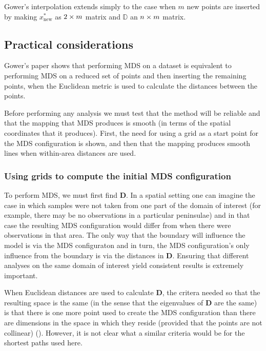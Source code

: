 Gower's interpolation extends simply to the case when $m$ new points are inserted by making $x^*_{\text{new}}$ as $2 \times m$ matrix and $\mathbb{D}$ an $n \times m$ matrix.


\subsection{Practical considerations}

Gower's paper shows that performing MDS on a dataset is equivalent to performing MDS on a reduced set of points and then inserting the remaining points, when the Euclidean metric is used to calculate the distances between the points. 

Before performing any analysis we must test that the method will be reliable and that the mapping that MDS produces  is smooth (in terms of the spatial coordinates that it produces). First, the need for using a grid as a start point for the MDS configuration is shown, and then that the mapping produces smooth lines when within-area distances are used.

\subsubsection{Using grids to compute the initial MDS configuration}
\label{grids}

To perform MDS, we must first find $\mathbf{D}$. In a spatial setting one can imagine the case in which samples were not taken from one part of the domain of interest (for example, there may be no observations in a particular peninsulae) and in that case the resulting MDS configuration would differ from when there were observations in that area. The only way that the boundary will influence the model is via the MDS configuraton and in turn, the MDS configuration's only influence from the boundary is via the distances in $\mathbf{D}$. Ensuring that different analyses on the same domain of interest yield consistent results is extremely important. 

When Euclidean distances are used to calculate $\mathbf{D}$, the critera needed so that the resulting space is the same (in the sense that the eigenvalues of $\mathbf{D}$ are the same) is that there is one more point used to create the MDS configuration than there are dimensions in the space in which they reside (provided that the points are not collinear) (\cite{landmark}). However, it is not clear what a similar criteria would be for the shortest paths used here. 

